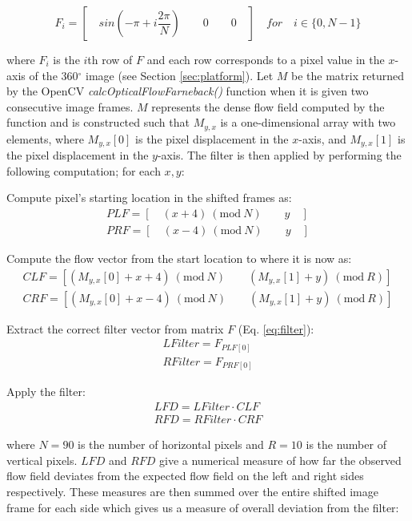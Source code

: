 \documentclass[a4paper,11pt,twoside,openright]{article}
\newcommand{\Mod}[1]{\ (\mathrm{mod}\ #1)}
\begin{document}
\begin{equation}
  \label{eq:filter}
F_i = [ \quad sin(-\pi + i\frac{2\pi}{N}) \qquad 0 \qquad 0 \quad ]
\quad \textit{for} \quad i \in \{0, N - 1\}
\end{equation}

where $F_i$ is the $i$th row of $F$ and each row corresponds to a
pixel value in the $x$-axis of the 360$^\circ$ image (see Section
\ref{sec:platform}). Let $M$ be the matrix returned by the OpenCV
\textit{calcOpticalFlowFarneback()} function when it is given two
consecutive image frames. $M$ represents the dense
flow field computed by the function and is constructed such that
$M_{y,x}$ is a one-dimensional array with two elements, where
$M_{y,x}[0]$ is the pixel displacement in the $x$-axis, and
$M_{y,x}[1]$ is the pixel displacement in the $y$-axis. The filter is
then applied by performing the following computation; for each $x,y$:
\newline\par

\centering
Compute pixel's starting location in the shifted frames as:
\begin{align*}
  PLF = [ \quad (x + 4)\Mod{N} \qquad y \quad ]\\
  PRF = [ \quad (x - 4)\Mod{N} \qquad y \quad ]
\end{align*}

Compute the flow vector from the start location to where it is now as:
\begin{align*}
  CLF = [ (M_{y,x}[0] + x + 4)\Mod{N} \qquad (M_{y,x}[1] + y) \Mod{R} ]\\
  CRF = [ (M_{y,x}[0] + x - 4)\Mod{N} \qquad (M_{y,x}[1] + y) \Mod{R} ]
\end{align*}

Extract the correct filter vector from matrix $F$ (Eq. \ref{eq:filter}):
\begin{align*}
  LFilter = F_{PLF[0]}\\
  RFilter = F_{PRF[0]}
\end{align*}

Apply the filter:
\begin{align}
  LFD = LFilter \cdot CLF \\
  RFD = RFilter \cdot CRF
\end{align}

\raggedright where $N=90$ is the number of horizontal pixels and
$R=10$ is the number of vertical pixels. $LFD$ and $RFD$ give a
numerical measure of how far the observed flow field deviates from the
expected flow field on the left and right sides respectively. These
measures are then summed over the entire shifted image frame for each
side which gives us a measure of overall deviation from the filter:
\end{document}
